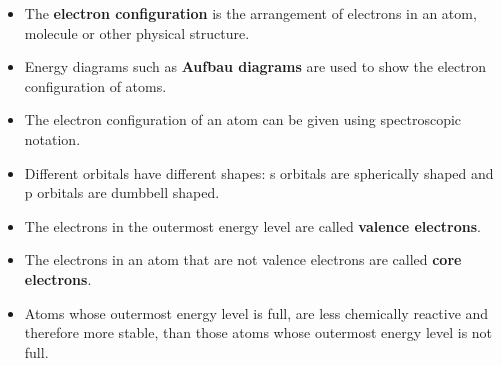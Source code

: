 \begin{itemize}[noitemsep]
\item The \textbf{electron configuration} is the arrangement of electrons in an atom, molecule or other physical structure.
\label{m38741*uid180}\item Energy diagrams such as \textbf{Aufbau diagrams} are used to show the electron configuration of atoms.
\item The electron configuration of an atom can be given using spectroscopic notation. 
\item Different orbitals have different shapes: s orbitals are spherically shaped and p orbitals are dumbbell shaped.
\label{m38741*uid181}\item The electrons in the outermost energy level are called \textbf{valence electrons}.
\label{m38741*uid182}\item The electrons in an atom that are not valence electrons are called \textbf{core electrons}.
\label{m38741*uid183}\item Atoms whose outermost energy level is full, are less chemically reactive and therefore more stable, than those atoms whose outermost energy level is not full.
\end{itemize}

